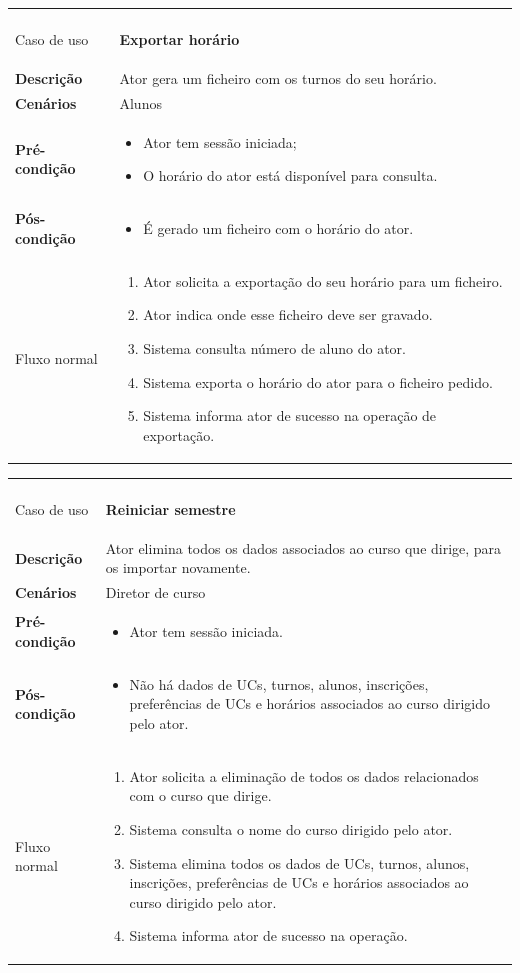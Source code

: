 \documentclass[12pt, a4paper]{article}
\newenvironment{condition}{
    \begin{itemize}[wide=0pt]
        \vspace{-0.2cm}
}{
        \vspace{-0.5cm}
    \end{itemize}
}
\newcommand\flow[1]{
    Fluxo normal &
    \vspace{-0.9cm}
    \singlespacing
    \begin{enumerate}[wide=0pt]
        #1
        \vspace{-0.3cm}
    \end{enumerate} \\ \hline
}
\newenvironment{usecase}[5]{
    \begin{longtable}{|>{\centering\arraybackslash\bf}m{3cm}|m{13cm}|}
        \multicolumn{2}{c}{\ldots Continua \ldots} \\
        \endfoot
        \endlastfoot

        \hline
        Caso de uso & \textbf{#1} \\

        \hline
        Descrição & #2 \\

        \hline
        Cenários & #3 \\

        \hline
        Pré-condição &
        \vspace{-0.8cm}
        \begin{condition}
            #4
        \end{condition} \\

        \hline
        Pós-condição &
        \vspace{-0.8cm}
        \begin{condition}
            #5
        \end{condition} \\

        \hline
}{
\end{longtable}
}
\begin{document}
\begin{usecase}
    {Exportar horário}
    {Ator gera um ficheiro com os turnos do seu horário.}
    {Alunos}
    {
        \item Ator tem sessão iniciada;
        \item O horário do ator está disponível para consulta.
    }
    {\item É gerado um ficheiro com o horário do ator.}

    \flow{
        \item Ator solicita a exportação do seu horário para um ficheiro.
        \item Ator indica onde esse ficheiro deve ser gravado.
        \item Sistema consulta número de aluno do ator.
        \item Sistema exporta o horário do ator para o ficheiro pedido.
        \item Sistema informa ator de sucesso na operação de exportação.
    }
\end{usecase}

\begin{usecase}
    {Reiniciar semestre}
    {Ator elimina todos os dados associados ao curso que dirige, para os importar novamente.}
    {Diretor de curso}
    {\item Ator tem sessão iniciada.}
    {
        \item Não há dados de UCs, turnos, alunos, inscrições, preferências de UCs e horários
            associados ao curso dirigido pelo ator.
    }

    \flow{
        \item Ator solicita a eliminação de todos os dados relacionados com o curso que dirige.
        \item Sistema consulta o nome do curso dirigido pelo ator.
        \item Sistema elimina todos os dados de UCs, turnos, alunos, inscrições, preferências de UCs
            e horários associados ao curso dirigido pelo ator.
        \item Sistema informa ator de sucesso na operação.
    }
\end{usecase}
\end{document}
